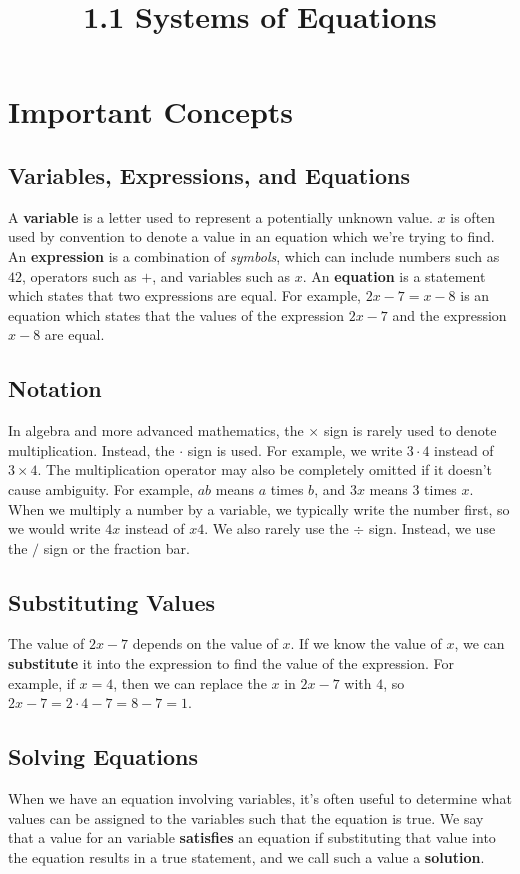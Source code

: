 \documentclass{article}
\title{1.1 Systems of Equations}
\author{}
\date{}
\begin{document}
    \maketitle
    \section*{Important Concepts}
    \subsection*{Variables, Expressions, and Equations}
    A \textbf{variable} is a letter used to represent a potentially unknown
    value. $x$ is often used by convention to denote a value in an equation
    which we're trying to find. An \textbf{expression} is a combination of
    \emph{symbols}, which can include numbers such as $42$, operators such as
    $+$, and variables such as $x$. An \textbf{equation} is a statement which
    states that two expressions are equal. For example, $2x - 7 = x - 8$ is an
    equation which states that the values of the expression $2x - 7$ and the
    expression $x - 8$ are equal.
    \subsection*{Notation}
    In algebra and more advanced mathematics, the $\times$ sign is rarely used
    to denote multiplication. Instead, the $\cdot$ sign is used. For example, we
    write $3 \cdot 4$ instead of $3 \times 4$. The multiplication operator may
    also be completely omitted if it doesn't cause ambiguity. For example, $ab$
    means $a$ times $b$, and $3x$ means $3$ times $x$. When we multiply a number
    by a variable, we typically write the number first, so we would write $4x$
    instead of $x4$. We also rarely use the $\div$ sign. Instead, we use the $/$
    sign or the fraction bar.
    \subsection*{Substituting Values}
    The value of $2x - 7$ depends on the value of $x$. If we know the value of
    $x$, we can \textbf{substitute} it into the expression to find the value of
    the expression. For example, if $x = 4$, then we can replace the $x$ in $2x
    - 7$ with $4$, so $2x - 7 = 2 \cdot 4 - 7 = 8 - 7 = 1$.
    \subsection*{Solving Equations}
    When we have an equation involving variables, it's often useful to determine
    what values can be assigned to the variables such that the equation is true.
    We say that a value for an variable \textbf{satisfies} an equation if
    substituting that value into the equation results in a true statement, and
    we call such a value a \textbf{solution}.
\end{document}

